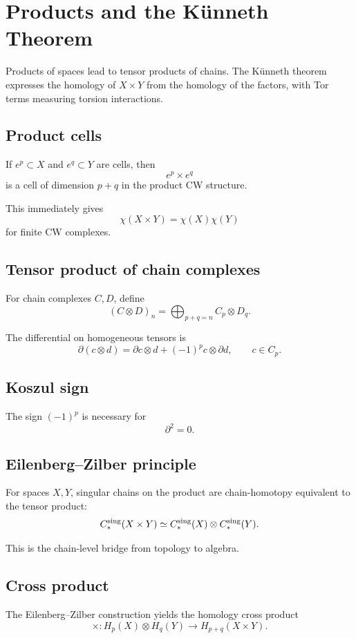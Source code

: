 ﻿\chapter{Products and the Künneth Theorem}
\label{ch:viii27-products-kunneth}

Products of spaces lead to tensor products of chains.  The Künneth theorem
expresses the homology of \(X\times Y\) from the homology of the factors, with
Tor terms measuring torsion interactions.

\section{Product cells}
If \(e^p\subset X\) and \(e^q\subset Y\) are cells, then
\[
e^p\times e^q
\]
is a cell of dimension \(p+q\) in the product CW structure.

This immediately gives
\[
\chi(X\times Y)=\chi(X)\chi(Y)
\]
for finite CW complexes.

\section{Tensor product of chain complexes}
For chain complexes \(C,D\), define
\[
(C\otimes D)_n
=
\bigoplus_{p+q=n}C_p\otimes D_q.
\]

The differential on homogeneous tensors is
\[
\partial(c\otimes d)
=
\partial c\otimes d
+
(-1)^p c\otimes\partial d,
\qquad c\in C_p.
\]

\section{Koszul sign}
The sign \((-1)^p\) is necessary for
\[
\partial^2=0.
\]

\section{Eilenberg--Zilber principle}
For spaces \(X,Y\), singular chains on the product are chain-homotopy
equivalent to the tensor product:
\[
C_*^{\rm sing}(X\times Y)
\simeq
C_*^{\rm sing}(X)\otimes C_*^{\rm sing}(Y).
\]

This is the chain-level bridge from topology to algebra.

\section{Cross product}
The Eilenberg--Zilber construction yields the homology cross product
\[
\times:
H_p(X)\otimes H_q(Y)
\to
H_{p+q}(X\times Y).
\]

